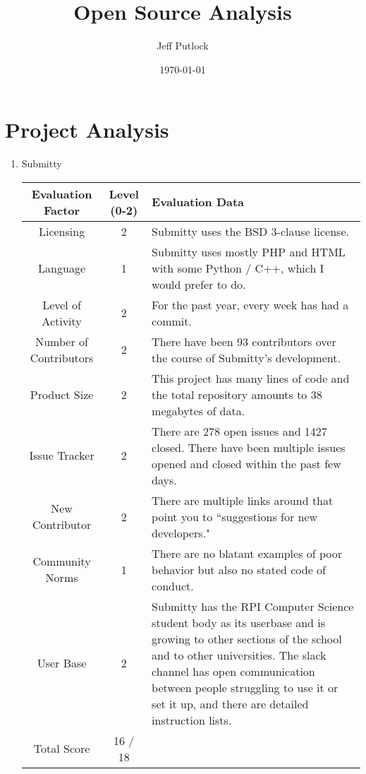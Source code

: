 \documentclass[12pt]{article}
\author{Jeff Putlock}
\date{\today}
\title{\vspace*{-3cm}Open Source Analysis}
\begin{document}
	
	\maketitle
	
	\section{Project Analysis}
	
	\begin{enumerate}
		\item Submitty
		
		\hspace*{-1cm}
		\noindent\begin{tabular}{ | c | c | L | } 
			\hline
			Evaluation Factor & Level (0-2) & Evaluation Data \\\hline
			Licensing & 2 & Submitty uses the BSD 3-clause license. \\\hline
			Language & 1 & Submitty uses mostly PHP and HTML with some Python / C++, which I would prefer to do. \\\hline
			Level of Activity & 2 & For the past year, every week has had a commit. \\\hline		
			Number of Contributors & 2 & There have been 93 contributors over the course of Submitty's development. \\\hline
			Product Size & 2 & This project has many lines of code and the total repository amounts to 38 megabytes of data. \\\hline
			Issue Tracker & 2 & There are 278 open issues and 1427 closed. There have been multiple issues opened and closed within the past few days. \\\hline
			New Contributor & 2 & There are multiple links around that point you to ``suggestions for new developers." \\\hline
			Community Norms & 1 & There are no blatant examples of poor behavior but also no stated code of conduct. \\\hline
			User Base & 2 & Submitty has the RPI Computer Science student body as its userbase and is growing to other sections of the school and to other universities. The slack channel has open communication between people struggling to use it or set it up, and there are detailed instruction lists. \\\hline
			Total Score & 16 / 18& \\\hline
		\end{tabular}
	
	\newpage
	

\end{enumerate}
\end{document}
